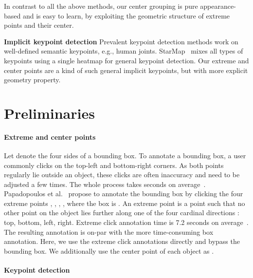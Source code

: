 \documentclass[10pt,twocolumn,letterpaper]{article}
\begin{document}
In contrast to all the above methods, our center grouping is pure appearance-based and is easy to learn, by exploiting the geometric structure of extreme points and their center.

\textbf{Implicit keypoint detection}
Prevalent keypoint detection methods work on well-defined semantic keypoints, e.g., human joints. 
StarMap~\cite{zhou2018starmap} mixes all types of keypoints using a single heatmap for general keypoint detection. 
Our extreme and center points are a kind of such general implicit keypoints, but with more explicit geometry property.

\section{Preliminaries}

\paragraph{Extreme and center points}

Let  denote the four sides of a bounding box.
To annotate a bounding box, a user commonly clicks on the top-left  and bottom-right  corners.
As both points regularly lie outside an object, these clicks are often inaccuracy and need to be adjusted a few times.
The whole process takes  seconds on average~\cite{su2012crowdsourcing}. 
Papadopoulos et al.~\cite{papadopoulos2017extreme} propose to annotate the bounding box by clicking the four extreme points , , , , where the box is .
An extreme point is a point  such that no other point  on the object lies further along one of the four cardinal directions : top, bottom, left, right.
Extreme click annotation time is 7.2 seconds on average~\cite{papadopoulos2017extreme}.
The resulting annotation is on-par with the more time-consuming box annotation.
Here, we use the extreme click annotations directly and bypass the bounding box.
We additionally use the center point of each object as . 

\paragraph{Keypoint detection}
\end{document}
